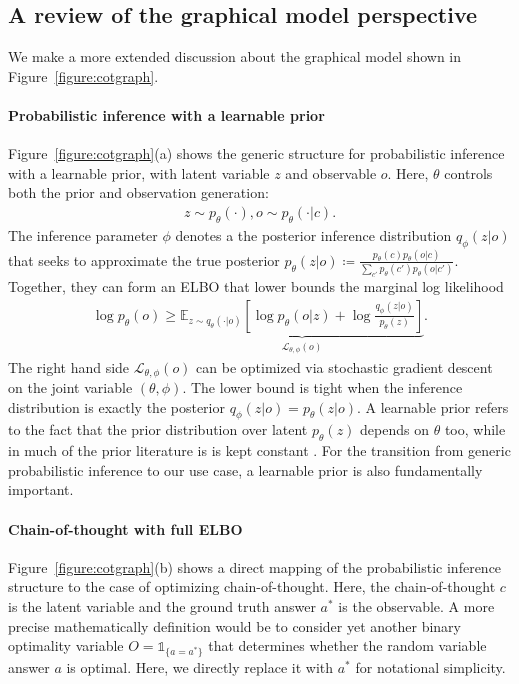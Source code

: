 \documentclass{article}
\theoremstyle{definition}
\begin{document}
\begin{appendix}


\section{A review of the graphical model perspective}\label{appendix:graph}

We make a more extended discussion about the graphical model shown in Figure~\ref{figure:cotgraph}. 

\paragraph{Probabilistic inference with a learnable prior} Figure~\ref{figure:cotgraph}(a) shows the generic structure for probabilistic inference with a learnable prior, with latent variable $z$ and observable $o$. Here, $\theta$ controls both the prior and observation generation:
\begin{align*}
    z\sim p_\theta(\cdot), o\sim p_\theta(\cdot|c).
\end{align*}
The inference parameter $\phi$ denotes a the posterior inference distribution $q_\phi(z|o)$ that seeks to approximate the true posterior $p_\theta(z|o)\coloneqq\frac{p_\theta(c)p_\theta(o|c)}{\sum_{c'} p_\theta(c')p_\theta(o|c')}$. Together, they can form an ELBO that lower bounds the marginal log likelihood \citep{blei2017variational}
\begin{align*}
    \log p_\theta(o) \geq \underbrace{\mathbb{E}_{z\sim q_\theta(\cdot|o)}\left[\log p_\theta(o|z) + \log\frac{q_\phi(z|o)}{p_\theta(z)}\right]}_{\mathcal{L}_{\theta,\phi}(o)}.
\end{align*}
The right hand side $\mathcal{L}_{\theta,\phi}(o)$ can be optimized via stochastic gradient descent on the joint variable $(\theta,\phi)$. The lower bound is tight when the inference distribution is exactly the 
posterior $q_\phi(z|o)=p_\theta(z|o)$. A learnable prior refers to the fact that the prior distribution over latent $p_\theta(z)$ depends on $\theta$ too, while in much of the prior literature is is kept constant \citep{hoffman2016elbo,blei2017variational}. For the transition from generic probabilistic inference to our use case, a learnable prior is also fundamentally important.

\paragraph{Chain-of-thought with full ELBO} Figure~\ref{figure:cotgraph}(b) shows a direct mapping of the probabilistic inference structure to the case of optimizing chain-of-thought. Here, the chain-of-thought $c$ is the latent variable and the ground truth answer $a^*$ is the observable. A more precise mathematically definition would be to consider yet another binary optimality variable $O=\mathds{1}_{\{a=a^\ast\}}$ that determines whether the random variable answer $a$ is optimal. Here, we directly replace it with $a^*$ for notational simplicity.


\end{appendix}
\end{document}
